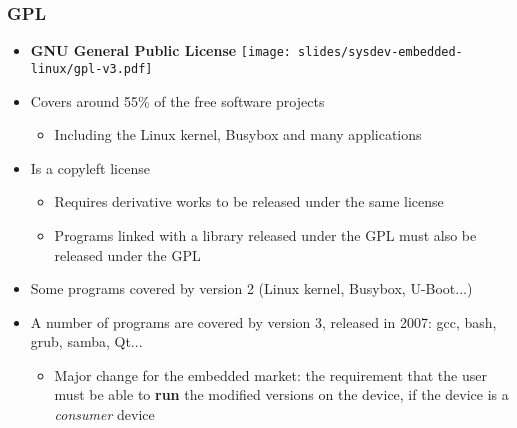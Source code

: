 \begin{frame}
  \frametitle{GPL}
  \begin{itemize}
  \item {\bf GNU General Public License}
    \hfill \texttt{[image: slides/sysdev-embedded-linux/gpl-v3.pdf]}
  \item Covers around 55\% of the free software projects
    \begin{itemize}
    \item Including the Linux kernel, Busybox and many applications
    \end{itemize}
  \item Is a copyleft license
    \begin{itemize}
    \item Requires derivative works to be released under the same
      license
    \item Programs linked with a library released under the GPL must
      also be released under the GPL
    \end{itemize}
  \item Some programs covered by version 2 (Linux kernel, Busybox, U-Boot...)
  \item A number of programs are covered by version 3, released in 2007:
	gcc, bash, grub, samba, Qt...
    \begin{itemize}
    \item Major change for the embedded market: the requirement that
      the user must be able to {\bf run} the modified versions on the
      device, if the device is a {\em consumer} device
    \end{itemize}
  \end{itemize}
\end{frame}

